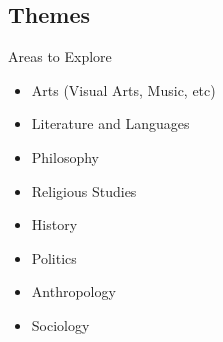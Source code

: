 \subsection{Themes}
\begin{frame}{Areas to Explore}
	\begin{itemize}
		\item<1->Arts (Visual Arts, Music, etc)
		\item<2->Literature and Languages
		\item<3->Philosophy
		\item<4->Religious Studies
		\item<5->History
		\item<5->Politics
		\item<6->Anthropology
		\item<6->Sociology
	\end{itemize}
\end{frame}

\timeout